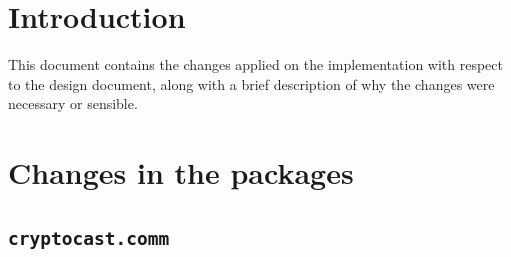 \documentclass[a4paper,10pt]{scrartcl}
\title{\doctitle}
\author{\authorName}
\date{\today}
\begin{document}

\tableofcontents
\clearpage

\section{Introduction}
This document contains the changes applied on the implementation with respect to the design document, along with a brief description of why the changes were necessary or sensible.

\section{Changes in the packages}
\subsection{\lstinline|cryptocast.comm|}
\end{document}
